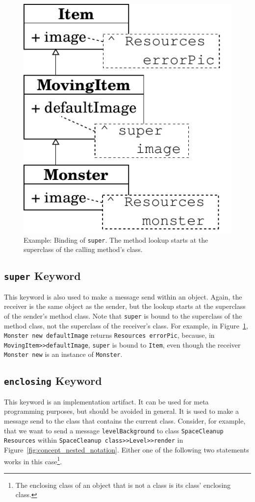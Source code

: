 \begin{figure}
	\includegraphics[scale=0.75]{super_binding.pdf}
	\centering
	\caption[Example: Binding of \texttt{super}]{Example: Binding of \texttt{super}. The method lookup starts at the superclass of the calling method's class.}
	\label{fig:concept_super_binding}
\end{figure}

\subsection{\texttt{super} Keyword}
This keyword is also used to make a message send within an object. Again, the receiver is the same object as the sender, but the lookup starts at the superclass of the sender's method class. Note that \texttt{super} is bound to the superclass of the method class, not the superclass of the receiver's class. For example, in Figure~\ref{fig:concept_super_binding}, \texttt{Monster new defaultImage} returns \texttt{Resources errorPic}, because, in \texttt{MovingItem>>defaultImage}, \texttt{super} is bound to \texttt{Item}, even though the receiver \texttt{Monster new} is an instance of \texttt{Monster}.

\subsection{\texttt{enclosing} Keyword}
This keyword is an implementation artifact. It can be used for meta programming purposes, but should be avoided in general. It is used to make a message send to the class that contains the current class. Consider, for example, that we want to send a message \texttt{levelBackground} to class \texttt{SpaceCleanup Resources} within \texttt{SpaceCleanup class>>Level>>render} in Figure~\ref{fig:concept_nested_notation}. Either one of the following two statements works in this case\footnote{The enclosing class of an object that is not a class is its class' enclosing class.}.

